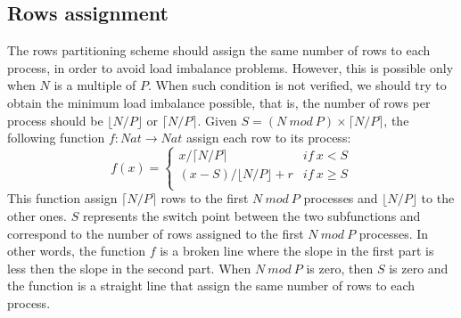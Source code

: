 \documentclass{article}
\begin{document}
\subsection{Rows assignment} \label{sec:rowsassignment}
The rows partitioning scheme should assign the same number of rows to each process, in order to avoid load imbalance problems. However, this is possible only when $N$ is a multiple of $P$. When such condition is not verified, we should try to obtain the minimum load imbalance possible, that is, the number of rows per process should be $\lfloor N/P \rfloor$ or $\lceil N/P \rceil$. Given $S = (N~mod~P) \times \lceil N/P \rceil$, the following function $f: Nat \to Nat$ assign each row to its process:
\[
f(x)=
\begin{cases}
x / \lceil N/P \rceil & if~x < S \\
(x - S) / \lfloor N/P \rfloor + r & if~x \geq S \\
\end{cases}
\]
This function assign $\lceil N/P \rceil$ rows to the first $N~mod~P$ processes and $\lfloor N/P \rfloor$ to the other ones. $S$ represents the switch point between the two subfunctions and correspond to the number of rows assigned to the first $N~mod~P$ processes. In other words, the function $f$ is a broken line where the slope in the first part is less then the slope in the second part. When $N~mod~P$ is zero, then $S$ is zero and the function is a straight line that assign the same number of rows to each process.
\end{document}
